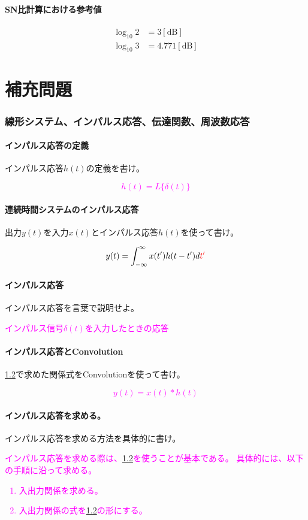 \documentclass[twocolumn]{ltjsarticle}
\newcommand{\visible}{visible}
\newcommand{\ans}[1]{
\begin{tcolorbox}[\visible]
\textcolor{magenta}{#1}
\end{tcolorbox}
}
\begin{document}
\subsection{SN比計算における参考値}
\begin{align*}
    \log_{10}2&=3[\mathrm{dB}]\\
    \log_{10}3&=4.771[\mathrm{dB}]
\end{align*}

\clearpage
\part*{補充問題}
\section{線形システム、インパルス応答、伝達関数、周波数応答}
\subsection{インパルス応答の定義}
インパルス応答$h(t)$の定義を書け。
\ans{$$h(t)=L\{\delta(t)\}$$}
\subsection{連続時間システムのインパルス応答}\label{yhx}
出力$y(t)$を入力$x(t)$とインパルス応答$h(t)$を使って書け。
\ans{
\begin{align*}
y(t)=\int_{-\infty}^{\infty}x(t')h(t-t')d\textcolor{red}{t'}
\end{align*}
}
\subsection{インパルス応答}
インパルス応答を言葉で説明せよ。
\ans{インパルス信号$\delta(t)$を入力したときの応答}
\subsection{インパルス応答とConvolution}\label{yhx_c}
\ref{yhx}で求めた関係式をConvolutionを使って書け。
\ans{$$y(t)=x(t)*h(t)$$}
\subsection{インパルス応答を求める。}
インパルス応答を求める方法を具体的に書け。
\ans{
    インパルス応答を求める際は、\ref{yhx}を使うことが基本である。
    具体的には、以下の手順に沿って求める。
    \begin{enumerate}
        \item 入出力関係を求める。
        \item 入出力関係の式を\ref{yhx}の形にする。
    \end{enumerate}
}
\end{document}
